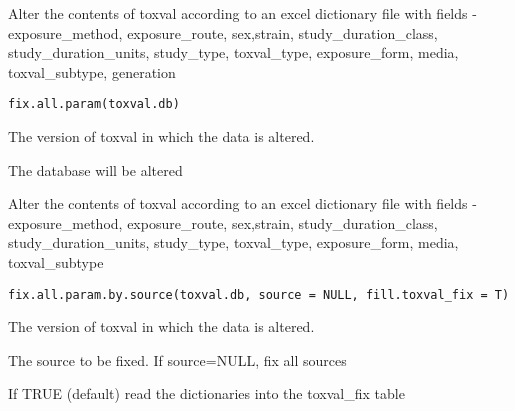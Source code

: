 \documentclass[letterpaper]{book}
\begin{document}
%
\begin{Description}\relax
Alter the contents of toxval according to an excel dictionary file with fields -
exposure\_method, exposure\_route, sex,strain, study\_duration\_class, study\_duration\_units, study\_type,
toxval\_type, exposure\_form, media, toxval\_subtype, generation
\end{Description}
%
\begin{Usage}
\begin{verbatim}
fix.all.param(toxval.db)
\end{verbatim}
\end{Usage}
%
\begin{Arguments}
\begin{ldescription}
\item[\code{toxval.db}] The version of toxval in which the data is altered.
\end{ldescription}
\end{Arguments}
%
\begin{Value}
The database will be altered
\end{Value}
%
\begin{Description}\relax
Alter the contents of toxval according to an excel dictionary file with fields -
exposure\_method, exposure\_route, sex,strain, study\_duration\_class, study\_duration\_units, study\_type,
toxval\_type, exposure\_form, media, toxval\_subtype
\end{Description}
%
\begin{Usage}
\begin{verbatim}
fix.all.param.by.source(toxval.db, source = NULL, fill.toxval_fix = T)
\end{verbatim}
\end{Usage}
%
\begin{Arguments}
\begin{ldescription}
\item[\code{toxval.db}] The version of toxval in which the data is altered.

\item[\code{source}] The source to be fixed. If source=NULL, fix all sources

\item[\code{fill.toxval\_fix}] If TRUE (default) read the dictionaries into the toxval\_fix table
\end{ldescription}
\end{Arguments}
\end{document}

